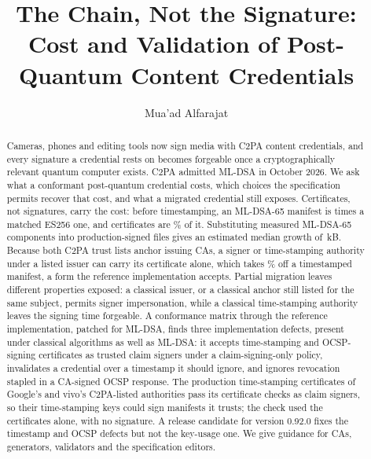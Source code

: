 \documentclass[acmsmall,screen,review]{acmart}
\begin{document}
\title[The Chain, Not the Signature]{The Chain, Not the Signature: Cost and Validation of Post-Quantum
Content Credentials}

\author{Mua'ad Alfarajat}

\renewcommand{\shortauthors}{Alfarajat}

\begin{abstract}
Cameras, phones and editing tools now sign media with C2PA content
credentials, and every signature a credential rests on becomes forgeable once a
cryptographically relevant quantum computer exists. C2PA admitted ML-DSA in
October 2026. We ask what a conformant post-quantum credential costs, which
choices the specification permits recover that cost, and what a migrated
credential still exposes. Certificates, not signatures, carry the cost: before
timestamping, an
ML-DSA-65 manifest is \NvsESDSAsixtyfive{} times a matched ES256 one, and
certificates are \NchainShareManDSAsixtyfive\% of it. Substituting measured
ML-DSA-65 components into \NcpqFiles{} production-signed files gives an
estimated median growth of \NcpqAddMedkB\,kB. Because both C2PA trust lists
anchor issuing CAs, a signer or time-stamping authority under a listed issuer
can carry its certificate alone, which takes \NtsBothLeafPct\% off a
timestamped manifest, a form the reference implementation accepts. Partial
migration leaves different properties exposed: a classical issuer, or a classical anchor still listed for
the same subject, permits signer impersonation, while a classical
time-stamping authority leaves the signing time forgeable. A conformance
matrix through the reference implementation, patched for ML-DSA, finds three
implementation defects, present under classical algorithms as well as ML-DSA:
it accepts time-stamping and OCSP-signing certificates as trusted claim signers under a
claim-signing-only policy, invalidates a credential over a timestamp it
should ignore, and ignores revocation stapled in a CA-signed OCSP response. The production time-stamping certificates of
Google's and vivo's C2PA-listed authorities pass its certificate checks as
claim signers, so their time-stamping keys could sign manifests it trusts;
the check used the certificates alone, with no signature. A release
candidate for version 0.92.0 fixes the timestamp and OCSP defects but not the
key-usage one. We give guidance for CAs, generators, validators and the specification editors.
\end{abstract}
\end{document}
